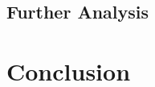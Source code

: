 \documentclass[11pt, oneside]{article}   	%
\begin{document}
\subsection{Further Analysis}

\section{Conclusion}



\nocite{*}


\end{document}
